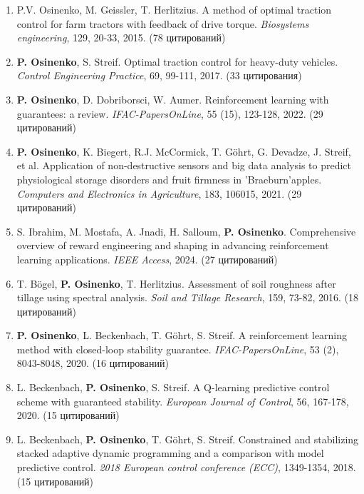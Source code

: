 \documentclass[12pt]{article}
\begin{document}
\begin{enumerate}[itemsep=5pt]

\item P.V. Osinenko, M. Geissler, T. Herlitzius. A method of optimal traction control for farm tractors with feedback of drive torque. \textit{Biosystems engineering}, 129, 20-33, 2015. (78 цитирований)

\item \textbf{P. Osinenko}, S. Streif. Optimal traction control for heavy-duty vehicles. \textit{Control Engineering Practice}, 69, 99-111, 2017. (33 цитирования)

\item \textbf{P. Osinenko}, D. Dobriborsci, W. Aumer. Reinforcement learning with guarantees: a review. \textit{IFAC-PapersOnLine}, 55 (15), 123-128, 2022. (29 цитирований)

\item \textbf{P. Osinenko}, K. Biegert, R.J. McCormick, T. Göhrt, G. Devadze, J. Streif, et al. Application of non-destructive sensors and big data analysis to predict physiological storage disorders and fruit firmness in 'Braeburn'apples. \textit{Computers and Electronics in Agriculture}, 183, 106015, 2021. (29 цитирований)

\item S. Ibrahim, M. Mostafa, A. Jnadi, H. Salloum, \textbf{P. Osinenko}. Comprehensive overview of reward engineering and shaping in advancing reinforcement learning applications. \textit{IEEE Access}, 2024. (27 цитирований)

\item T. Bögel, \textbf{P. Osinenko}, T. Herlitzius. Assessment of soil roughness after tillage using spectral analysis. \textit{Soil and Tillage Research}, 159, 73-82, 2016. (18 цитирований)

\item \textbf{P. Osinenko}, L. Beckenbach, T. Göhrt, S. Streif. A reinforcement learning method with closed-loop stability guarantee. \textit{IFAC-PapersOnLine}, 53 (2), 8043-8048, 2020. (16 цитирований)

\item L. Beckenbach, \textbf{P. Osinenko}, S. Streif. A Q-learning predictive control scheme with guaranteed stability. \textit{European Journal of Control}, 56, 167-178, 2020. (15 цитирований)

\item L. Beckenbach, \textbf{P. Osinenko}, T. Göhrt, S. Streif. Constrained and stabilizing stacked adaptive dynamic programming and a comparison with model predictive control. \textit{2018 European control conference (ECC)}, 1349-1354, 2018. (15 цитирований)


\end{enumerate}
\end{document}
